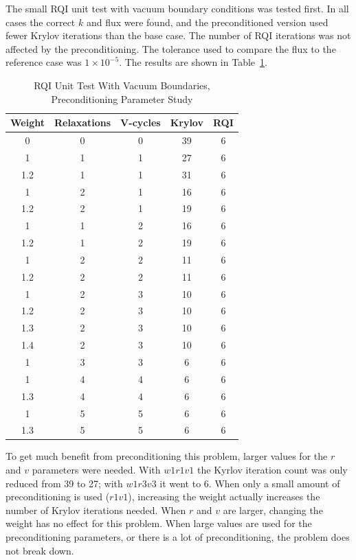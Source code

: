 The small RQI unit test with vacuum boundary conditions was tested first. In all cases the correct $k$ and flux were found, and the preconditioned version used fewer Krylov iterations than the base case. The number of RQI iterations was not affected by the preconditioning. The tolerance used to compare the flux to the reference case was $1 \times 10^{-5}$. The results are shown in Table~\ref{table:RQIUnitTestVac}.
%
\begin{table}[!h]
\caption{RQI Unit Test With Vacuum Boundaries, Preconditioning Parameter Study}
\begin{center}
\begin{tabular}{c c c c c}
\hline
Weight & Relaxations & V-cycles & Krylov & RQI \\[0.5ex]
\hline
0    & 0 & 0 & 39 & 6 \\
1    & 1 & 1 & 27 & 6 \\
1.2 & 1 & 1 & 31 & 6 \\
1    & 2 & 1 & 16 & 6 \\
1.2 & 2 & 1 & 19 & 6 \\
1    & 1 & 2 & 16 & 6 \\
1.2 & 1 & 2 & 19 & 6 \\
1    & 2 & 2 & 11 & 6 \\
1.2 & 2 & 2 & 11 & 6 \\
\hline
1    & 2 & 3 & 10 & 6 \\
1.2 & 2 & 3 & 10 & 6 \\
1.3 & 2 & 3 & 10 & 6 \\
1.4 & 2 & 3 & 10 & 6 \\
\hline
1    & 3 & 3 & 6   & 6 \\
1    & 4 & 4 & 6   & 6 \\
1.3 & 4 & 4 & 6   & 6 \\
1    & 5 & 5 & 6   & 6 \\
1.3 & 5 & 5 & 6   & 6 \\
\hline 
\end{tabular}
\end{center}
\label{table:RQIUnitTestVac}
\end{table}

To get much benefit from preconditioning this problem, larger values for the $r$ and $v$ parameters were needed. With $w1r1v1$ the Kyrlov iteration count was only reduced from 39 to 27; with $w1r3v3$ it went to 6. When only a small amount of preconditioning is used ($r1v1$), increasing the weight actually increases the number of Krylov iterations needed. When $r$ and $v$ are larger, changing the weight has no effect for this problem. When large values are used for the preconditioning parameters, or there is a lot of preconditioning, the problem does not break down. 

